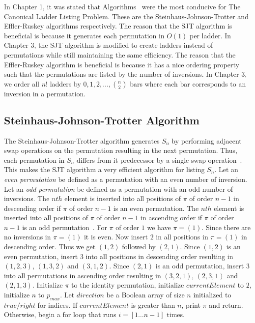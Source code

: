 In Chapter 1, it was stated that Algorithms~\cite{A25}\cite{A26} were the most conducive for The Canonical Ladder Listing Problem. 
These are the Steinhaus-Johnson-Trotter and Effler-Ruskey algorithms respectively. The reason that the SJT algorithm is beneficial 
is because it generates each permutation in $O(1)$ per ladder. In Chapter 3, the SJT 
algorithm is modified to create ladders instead of permutations while still maintaining the same efficiency.
The reason that the Effler-Ruskey algorithm 
is beneficial is because it has a nice ordering property such that the permutations are listed by the number of inversions. In Chapter 3, 
we order all $n!$ ladders by $0,1,2, \dots, {n \choose 2}$ bars where each bar corresponds to an inversion in a permutation.

\subsection{Steinhaus-Johnson-Trotter Algorithm}
The Steinhaus-Johnson-Trotter algorithm generates $S_{n}$ by performing adjacent swap operations 
on the permutation resulting in the next permutation. Thus, each permutation in $S_{n}$ differs 
from it predecessor by a single swap operation~\cite{A25}. This makes the SJT algorithm a very efficient 
algorithm for listing $S_{n}$. Let an \emph{even permutation} be defined as a permutation 
with an even number of inversion. Let an \emph{odd permutation} be defined as a 
permutation with an odd number of inversions. The $nth$ element is inserted into all 
positions of $\pi$ of order $n-1$ in descending order if $\pi$ of order $n-1$ is an even permutation.
The $nth$ element is inserted into all positions of $\pi$ of order $n-1$ in ascending order if 
$\pi$ of order $n-1$ is an odd permutation~\cite{A25}. For $\pi$ of order $1$ we have $\pi=(1)$. Since 
there are no inversions in $\pi=(1)$ it is even. Now insert $2$ in all positions in $\pi=(1)$
in descending order. Thus we get $(1,2)$ followed by $(2,1)$. Since $(1,2)$ is 
an even permutation, insert $3$ into all positions in descending order resulting in $(1,2,3)$,
$(1,3,2)$ and $(3,1,2)$. Since $(2,1)$ is an odd permutation, insert $3$ 
into all permutations in ascending order resulting in $(3,2,1)$, $(2,3,1)$ and $(2,1,3)$.
Initialize $\pi$ to the identity permutation, initialize $currentElement$ to $2$, initialize 
$n$ to $p_{max}$. Let $direction$ be a Boolean array of size $n$ initialized to $true/right$ for indices. 
If $currentElement$ is greater than $n$, print $\pi$ 
and return. Otherwise, begin a for loop that runs $i=[1 \dots n-1]$ times. 
